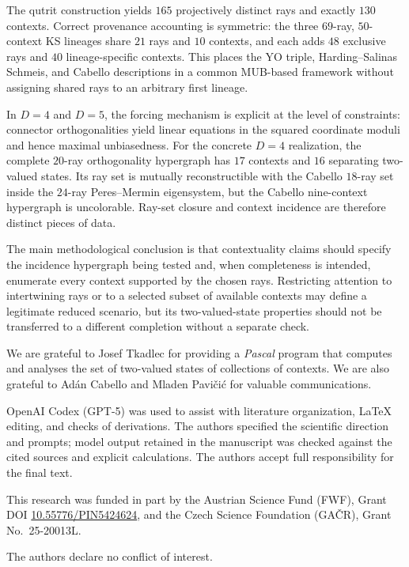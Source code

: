 \documentclass[%
  reprint,
  superscriptaddress,
  showpacs,
  showkeys,
  amsmath,amssymb,
  pra,
  longbibliography,
  floatfix,
  x11names
]{revtex4-2}
\newcommand{\rev}[1]{{\color{revisionblue}#1}}
\newenvironment{revision}{\begingroup\color{revisionblue}}{\endgroup}
\begin{document}
\begin{revision}
The qutrit construction yields $165$ projectively distinct rays and exactly $130$ contexts.  Correct provenance accounting is symmetric: the three $69$-ray, $50$-context KS lineages share $21$ rays and $10$ contexts, and each adds $48$ exclusive rays and $40$ lineage-specific contexts.  This places the YO triple, Harding--Salinas Schmeis, and Cabello descriptions in a common MUB-based framework without assigning shared rays to an arbitrary first lineage.

In $D=4$ and $D=5$, the forcing mechanism is explicit at the level of constraints: connector orthogonalities yield linear equations in the squared coordinate moduli and hence maximal unbiasedness.  For the concrete $D=4$ realization, the complete $20$-ray orthogonality hypergraph has $17$ contexts and $16$ separating two-valued states.  Its ray set is mutually reconstructible with the Cabello $18$-ray set inside the $24$-ray Peres--Mermin eigensystem, but the Cabello nine-context hypergraph is uncolorable.  Ray-set closure and context incidence are therefore distinct pieces of data.

The main methodological conclusion is that contextuality claims should specify the incidence hypergraph being tested and, when completeness is intended, enumerate every context supported by the chosen rays.  Restricting attention to intertwining rays or to a selected subset of available contexts may define a legitimate reduced scenario, but its two-valued-state properties should not be transferred to a different completion without a separate check.
\end{revision}

\begin{acknowledgments}
We are grateful to Josef Tkadlec for providing a {\em Pascal} program that computes and analyses the set of two-valued states of collections of contexts.
We are also grateful to Ad\'{a}n Cabello and Mladen Pavi{\v{c}}i{\'{c}} for valuable communications.

\rev{OpenAI Codex (GPT-5) was used to assist with literature organization, \LaTeX{}
editing, and checks of derivations.  The authors
specified the scientific
direction and prompts; model output retained in the manuscript was checked
against the cited sources and explicit calculations.  The authors accept
full
responsibility for the final text.}

This research was funded in part by the Austrian
Science Fund (FWF), Grant DOI \href{https://doi.org/10.55776/PIN5424624}{10.55776/PIN5424624},
and the Czech Science
Foundation (GA\v{C}R), Grant No.~25-20013L.

The authors declare no conflict of interest.
\end{acknowledgments}
\end{document}
